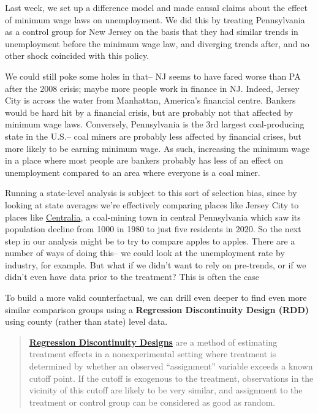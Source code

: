 \documentclass[
  letterpaper,
  DIV=11,
  numbers=noendperiod]{scrreprt}
\begin{document}
Last week, we set up a difference model and made causal claims about the
effect of minimum wage laws on unemployment. We did this by treating
Pennsylvania as a control group for New Jersey on the basis that they
had similar trends in unemployment before the minimum wage law, and
diverging trends after, and no other shock coincided with this policy.

We could still poke some holes in that-- NJ seems to have fared worse
than PA after the 2008 crisis; maybe more people work in finance in NJ.
Indeed, Jersey City is across the water from Manhattan, America's
financial centre. Bankers would be hard hit by a financial crisis, but
are probably not that affected by minimum wage laws. Conversely,
Pennsylvania is the 3rd largest coal-producing state in the U.S.-- coal
miners are probably less affected by financial crises, but more likely
to be earning minimum wage. As such, increasing the minimum wage in a
place where most people are bankers probably has less of an effect on
unemployment compared to an area where everyone is a coal miner.

Running a state-level analysis is subject to this sort of selection
bias, since by looking at state averages we're effectively comparing
places like Jersey City to places like
\href{https://en.wikipedia.org/wiki/Centralia,_Pennsylvania}{Centralia},
a coal-mining town in central Pennsylvania which saw its population
decline from 1000 in 1980 to just five residents in 2020. So the next
step in our analysis might be to try to compare apples to apples. There
are a number of ways of doing this-- we could look at the unemployment
rate by industry, for example. But what if we didn't want to rely on
pre-trends, or if we didn't even have data prior to the treatment? This
is often the case

To build a more valid counterfactual, we can drill even deeper to find
even more similar comparison groups using a \textbf{Regression
Discontinuity Design (RDD)} using county (rather than state) level data.

\begin{quote}
\textbf{\href{https://www.princeton.edu/~davidlee/wp/RDDEconomics.pdf}{Regression
Discontinuity Designs}} are a method of estimating treatment effects in
a nonexperimental setting where treatment is determined by whether an
observed ``assignment'' variable exceeds a known cutoff point. If the
cutoff is exogenous to the treatment, observations in the vicinity of
this cutoff are likely to be very similar, and assignment to the
treatment or control group can be considered as good as random.
\end{quote}
\end{document}
